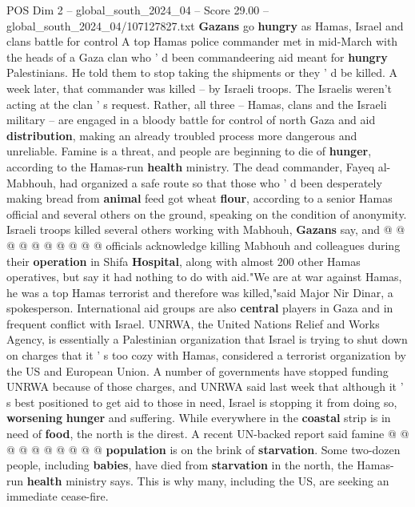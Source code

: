 \begin{textsample}{POS Dim 2 – global\_south\_2024\_04 – Score 29.00 – global\_south\_2024\_04/107127827.txt}  \label{ex:f2_pos_152}
\textbf{Gazans} go \textbf{hungry} as Hamas, Israel and clans battle for control A top Hamas police commander met in mid-March with the heads of a Gaza clan who ' d been commandeering aid meant for \textbf{hungry} Palestinians.
He told them to stop taking the shipments or they ' d be killed.
A week later, that commander was killed -- by Israeli troops.
The Israelis weren't acting at the clan ' s request.
Rather, all three -- Hamas, clans and the Israeli military -- are engaged in a bloody battle for control of north Gaza and aid \textbf{distribution}, making an already troubled process more dangerous and unreliable.
Famine is a threat, and people are beginning to die of \textbf{hunger}, according to the Hamas-run \textbf{health} ministry.
The dead commander, Fayeq al-Mabhouh, had organized a safe route so that those who ' d been desperately making bread from \textbf{animal} feed got wheat \textbf{flour}, according to a senior Hamas official and several others on the ground, speaking on the condition of anonymity.
Israeli troops killed several others working with Mabhouh, \textbf{Gazans} say, and @ @ @ @ @ @ @ @ @ @ officials acknowledge killing Mabhouh and colleagues during their \textbf{operation} in Shifa \textbf{Hospital}, along with almost 200 other Hamas operatives, but say it had nothing to do with aid."We are at war against Hamas, he was a top Hamas terrorist and therefore was killed,"said Major Nir Dinar, a spokesperson.
International aid groups are also \textbf{central} players in Gaza and in frequent conflict with Israel.
UNRWA, the United Nations Relief and Works Agency, is essentially a Palestinian organization that Israel is trying to shut down on charges that it ' s too cozy with Hamas, considered a terrorist organization by the US and European Union.
A number of governments have stopped funding UNRWA because of those charges, and UNRWA said last week that although it ' s best positioned to get aid to those in need, Israel is stopping it from doing so, \textbf{worsening} \textbf{hunger} and suffering.
While everywhere in the \textbf{coastal} strip is in need of \textbf{food}, the north is the direst.
A recent UN-backed report said famine @ @ @ @ @ @ @ @ @ @ \textbf{population} is on the brink of \textbf{starvation}.
Some two-dozen people, including \textbf{babies}, have died from \textbf{starvation} in the north, the Hamas-run \textbf{health} ministry says.
This is why many, including the US, are seeking an immediate cease-fire.

\end{textsample}
